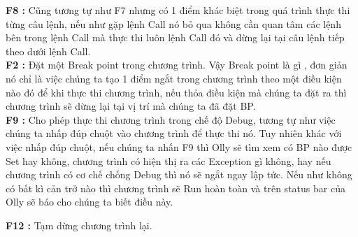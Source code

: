 		\textbf{F8 :} Cũng tương tự như F7 nhưng có 1 điểm khác biệt trong quá trình thực thi từng câu lệnh, nếu như gặp lệnh Call nó bỏ qua không cần quan tâm các lệnh bên trong lệnh Call mà thực thi luôn lệnh Call đó và dừng lại tại câu lệnh tiếp theo dưới lệnh Call.\\
		
		\textbf{F2 :} Đặt một Break point trong chương trình. Vậy Break point là gì , đơn giản nó chỉ là việc chúng ta tạo 1 điểm ngắt trong chương trình theo một điều kiện nào đó để khi thực thi chương trình, nếu thỏa điều kiện mà chúng ta đặt ra thì chương trình sẽ dừng lại tại vị trí mà chúng ta đã đặt BP.\\
		 
		\textbf{F9 :}  Cho phép thực thi chương trình trong chế độ Debug, tương tự như việc chúng ta nhấp đúp chuột vào chương trình để thực thi nó. Tuy nhiên khác với việc nhấp đúp chuột, nếu chúng ta nhấn F9 thì Olly sẽ tìm xem có BP nào được Set hay không, chương trình có hiện thị ra các Exception gì không, hay nếu chương trình có cơ chế chống Debug thì nó sẽ ngắt  ngay lập tức. Nếu như không có bất kì cản trở nào thì chương trình sẽ Run hoàn toàn và trên status bar của Olly sẽ báo cho chúng ta biết điều này.
		
		\textbf{F12 :} Tạm dừng chương trình lại.